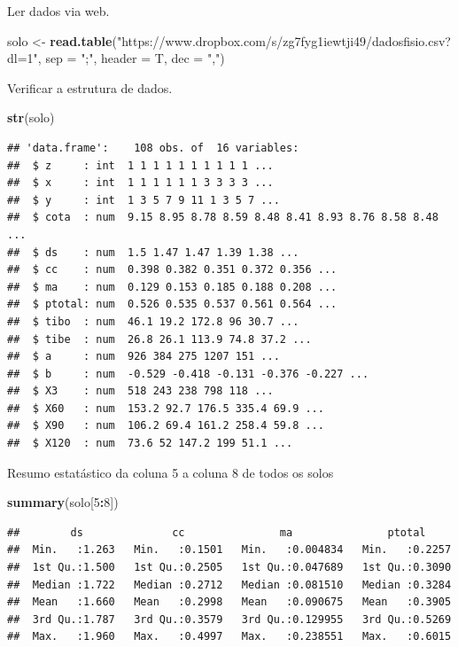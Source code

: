 \documentclass[]{book}
\newenvironment{Shaded}{\begin{snugshade}}{\end{snugshade}}
\newcommand{\DataTypeTok}[1]{\textcolor[rgb]{0.13,0.29,0.53}{#1}}
\newcommand{\DecValTok}[1]{\textcolor[rgb]{0.00,0.00,0.81}{#1}}
\newcommand{\KeywordTok}[1]{\textcolor[rgb]{0.13,0.29,0.53}{\textbf{#1}}}
\newcommand{\NormalTok}[1]{#1}
\newcommand{\OperatorTok}[1]{\textcolor[rgb]{0.81,0.36,0.00}{\textbf{#1}}}
\newcommand{\StringTok}[1]{\textcolor[rgb]{0.31,0.60,0.02}{#1}}
\begin{document}
Ler dados via web.

\begin{Shaded}
\begin{Highlighting}[]
\NormalTok{solo <-}\StringTok{ }\KeywordTok{read.table}\NormalTok{(}\StringTok{"https://www.dropbox.com/s/zg7fyg1iewtji49/dadosfisio.csv?dl=1"}\NormalTok{, }\DataTypeTok{sep =} \StringTok{";"}\NormalTok{, }\DataTypeTok{header =}\NormalTok{ T, }\DataTypeTok{dec =} \StringTok{","}\NormalTok{)}
\end{Highlighting}
\end{Shaded}

Verificar a estrutura de dados.

\begin{Shaded}
\begin{Highlighting}[]
\KeywordTok{str}\NormalTok{(solo)}
\end{Highlighting}
\end{Shaded}

\begin{verbatim}
## 'data.frame':    108 obs. of  16 variables:
##  $ z     : int  1 1 1 1 1 1 1 1 1 1 ...
##  $ x     : int  1 1 1 1 1 1 3 3 3 3 ...
##  $ y     : int  1 3 5 7 9 11 1 3 5 7 ...
##  $ cota  : num  9.15 8.95 8.78 8.59 8.48 8.41 8.93 8.76 8.58 8.48 ...
##  $ ds    : num  1.5 1.47 1.47 1.39 1.38 ...
##  $ cc    : num  0.398 0.382 0.351 0.372 0.356 ...
##  $ ma    : num  0.129 0.153 0.185 0.188 0.208 ...
##  $ ptotal: num  0.526 0.535 0.537 0.561 0.564 ...
##  $ tibo  : num  46.1 19.2 172.8 96 30.7 ...
##  $ tibe  : num  26.8 26.1 113.9 74.8 37.2 ...
##  $ a     : num  926 384 275 1207 151 ...
##  $ b     : num  -0.529 -0.418 -0.131 -0.376 -0.227 ...
##  $ X3    : num  518 243 238 798 118 ...
##  $ X60   : num  153.2 92.7 176.5 335.4 69.9 ...
##  $ X90   : num  106.2 69.4 161.2 258.4 59.8 ...
##  $ X120  : num  73.6 52 147.2 199 51.1 ...
\end{verbatim}

Resumo estatástico da coluna 5 a coluna 8 de todos os solos

\begin{Shaded}
\begin{Highlighting}[]
\KeywordTok{summary}\NormalTok{(solo[}\DecValTok{5}\OperatorTok{:}\DecValTok{8}\NormalTok{])}
\end{Highlighting}
\end{Shaded}

\begin{verbatim}
##        ds              cc               ma               ptotal      
##  Min.   :1.263   Min.   :0.1501   Min.   :0.004834   Min.   :0.2257  
##  1st Qu.:1.500   1st Qu.:0.2505   1st Qu.:0.047689   1st Qu.:0.3090  
##  Median :1.722   Median :0.2712   Median :0.081510   Median :0.3284  
##  Mean   :1.660   Mean   :0.2998   Mean   :0.090675   Mean   :0.3905  
##  3rd Qu.:1.787   3rd Qu.:0.3579   3rd Qu.:0.129955   3rd Qu.:0.5269  
##  Max.   :1.960   Max.   :0.4997   Max.   :0.238551   Max.   :0.6015
\end{verbatim}
\end{document}
